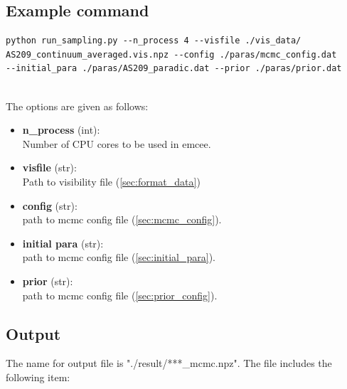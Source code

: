 \documentclass{report}
\begin{document}
\subsection{Example command}

\begin{verbatim}
python run_sampling.py --n_process 4 --visfile ./vis_data/
AS209_continuum_averaged.vis.npz --config ./paras/mcmc_config.dat 
--initial_para ./paras/AS209_paradic.dat --prior ./paras/prior.dat 


\end{verbatim}

The options are given as follows: 
    \begin{itemize}
        \item \textbf{n\_process} (int): \\ Number of CPU cores to be used in emcee.
        \item \textbf{visfile} (str): \\ Path to visibility file (\ref{sec:format_data})
        \item \textbf{config } (str):  \\ path to mcmc config file (\ref{sec:mcmc_config}). 
        \item \textbf{initial para} (str): \\ path to mcmc config file (\ref{sec:initial_para}). 
        \item \textbf{prior} (str):  \\ path to mcmc config file (\ref{sec:prior_config}). 
    \end{itemize}

\subsection{Output}
The name for output file is "./result/***\_mcmc.npz". The file includes the following item: 
%
\end{document}
